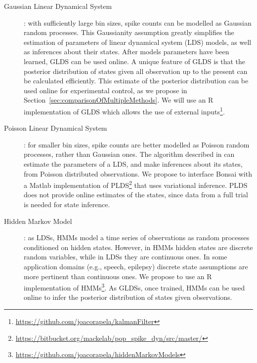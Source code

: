 \begin{description}

    \item[Gaussian Linear Dynamical
        System]\citep[GLDS;][]{andersonAndMoore12}: with sufficiently large
        bin sizes, spike counts can be modelled as Gaussian random processes.
        This Gaussianity assumption greatly simplifies the estimation of
        parameters of linear dynamical system (LDS) models, as well as
        inferences about their states. After models parameters have been
        learned, GLDS can be used online. A unique feature of GLDS is that the
        posterior distribution of states given all observation up to the
        present can be calculated efficiently. This estimate of the posterior
        distribution can be used online for experimental control, as we
        propose in Section~\ref{sec:comparisonOfMultipleMethods}. We will use an R implementation of GLDS
        which allows the use of external
        inputs\footnote{\href{https://github.com/joacorapela/kalmanFilter}{https://github.com/joacorapela/kalmanFilter}}.

    \item[Poisson Linear Dynamical System]\citep[PLDS;][]{mackeEtAl15}: for
        smaller bin sizes, spike counts are better modelled as Poisson random
        processes, rather than Gaussian ones. The algorithm described in
        \citet{mackeEtAl15} can estimate the parameters of a LDS, and make
        inferences about its states, from Poisson distributed observations.  We
        propose to interface Bonsai with a Matlab implementation of
        PLDS\footnote{\href{https://bitbucket.org/mackelab/pop\_spike\_dyn/src/master/}{https://bitbucket.org/mackelab/pop\_spike\_dyn/src/master/}}
        that uses variational inference. PLDS does not provide online estimates
        of the states, since data from a full trial is needed for state
        inference.

    \item[Hidden Markov Model]\citep[HMM;][]{rabiner89}: as LDSs, HMMs model a
        time series of observations as random processes conditioned on hidden
        states. However, in HMMs hidden states are discrete random variables,
        while in LDSs they are continuous ones. In some application domains
        (e.g., speech, epilepsy) discrete state assumptions are more pertinent
        than continuous ones. We propose to use an R implementation of
        HMMs\footnote{\href{https://github.com/joacorapela/hiddenMarkovModels}{https://github.com/joacorapela/hiddenMarkovModels}}.
        As GLDSs, once trained, HMMs can be used online to infer the posterior
        distribution of states given observations.


\end{description}
